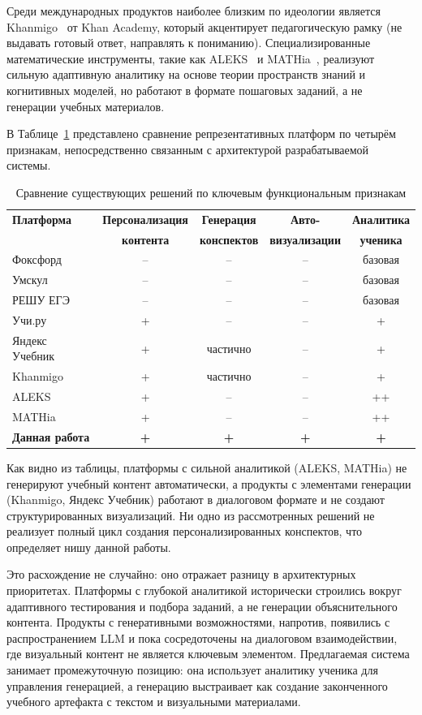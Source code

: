 Среди международных продуктов наиболее близким по идеологии является Khanmigo~\cite{Khanmigo2025} от Khan Academy, который акцентирует педагогическую рамку (не выдавать готовый ответ, направлять к пониманию). Специализированные математические инструменты, такие как ALEKS~\cite{ALEKS2025} и MATHia~\cite{CarnegieMATHia2025}, реализуют сильную адаптивную аналитику на основе теории пространств знаний и когнитивных моделей, но работают в формате пошаговых заданий, а не генерации учебных материалов.

В Таблице~\ref{tab:analogs} представлено сравнение репрезентативных платформ по четырём признакам, непосредственно связанным с архитектурой разрабатываемой системы.

\begin{table}[htbp]
\centering
\caption{Сравнение существующих решений по ключевым функциональным признакам}
\label{tab:analogs}
\small
\begin{tabular}{lcccc}
\hline
\textbf{Платформа} & \textbf{Персонализация} & \textbf{Генерация} & \textbf{Авто-} & \textbf{Аналитика} \\
 & \textbf{контента} & \textbf{конспектов} & \textbf{визуализации} & \textbf{ученика} \\
\hline
Фоксфорд          & --     & --     & --     & базовая \\
Умскул             & --     & --     & --     & базовая \\
РЕШУ ЕГЭ           & --     & --     & --     & базовая \\
Учи.ру             & +      & --     & --     & +       \\
Яндекс Учебник     & +      & частично & --   & +       \\
Khanmigo           & +      & частично & --   & +       \\
ALEKS              & +      & --     & --     & ++      \\
MATHia             & +      & --     & --     & ++      \\
\textbf{Данная работа} & \textbf{+} & \textbf{+} & \textbf{+} & \textbf{+} \\
\hline
\end{tabular}
\end{table}

Как видно из таблицы, платформы с сильной аналитикой (ALEKS, MATHia) не генерируют учебный контент автоматически, а продукты с элементами генерации (Khanmigo, Яндекс Учебник) работают в диалоговом формате и не создают структурированных визуализаций. Ни одно из рассмотренных решений не реализует полный цикл создания персонализированных конспектов, что определяет нишу данной работы.

Это расхождение не случайно: оно отражает разницу в архитектурных приоритетах. Платформы с глубокой аналитикой исторически строились вокруг адаптивного тестирования и подбора заданий, а не генерации объяснительного контента. Продукты с генеративными возможностями, напротив, появились с распространением LLM и пока сосредоточены на диалоговом взаимодействии, где визуальный контент не является ключевым элементом. Предлагаемая система занимает промежуточную позицию: она использует аналитику ученика для управления генерацией, а генерацию выстраивает как создание законченного учебного артефакта с текстом и визуальными материалами.